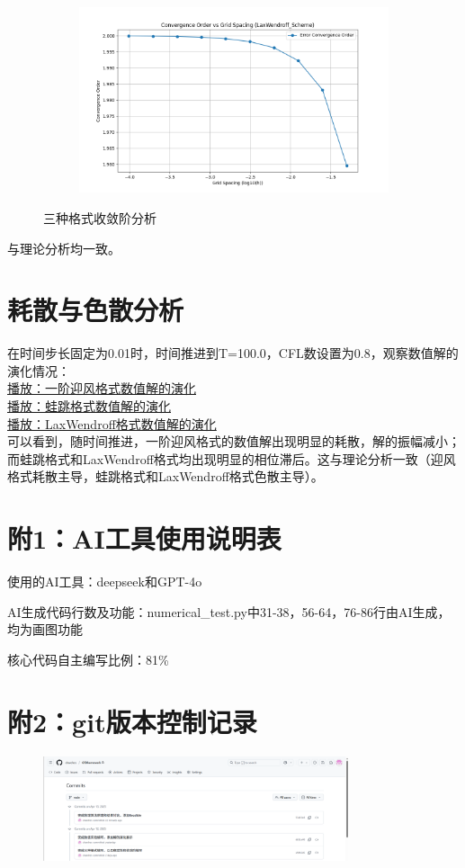 \documentclass[12pt, a4paper]{article}
\begin{document}
\begin{figure}[htbp]
\begin{subfigure}[b]{0.45\textwidth}
    \end{subfigure}
    \vspace{0.5cm}
    \centering
    \begin{subfigure}[b]{0.45\textwidth} 
        \centering
        \includegraphics[width=\textwidth]{./pictures/Convergence_Order_of_LaxWendroff_Scheme.png} 
    \end{subfigure}
    \caption{三种格式收敛阶分析}
\end{figure}
与理论分析均一致。

\section{耗散与色散分析}
在时间步长固定为0.01时，时间推进到T=100.0，CFL数设置为0.8，观察数值解的演化情况：\\
\href{run:./pictures/solution_evolution_of_Upwind_Scheme.mp4}{播放：一阶迎风格式数值解的演化}\\
\href{run:./pictures/solution_evolution_of_LeapFrog_Scheme.mp4}{播放：蛙跳格式数值解的演化}\\
\href{run:./pictures/solution_evolution_of_LaxWendroff_Scheme.mp4}{播放：LaxWendroff格式数值解的演化}\\

可以看到，随时间推进，一阶迎风格式的数值解出现明显的耗散，解的振幅减小；而蛙跳格式和LaxWendroff格式均出现明显的相位滞后。这与理论分析一致（迎风格式耗散主导，蛙跳格式和LaxWendroff格式色散主导）。

\section*{附1：AI工具使用说明表}
使用的AI工具：deepseek和GPT-4o

AI生成代码行数及功能：numerical\_test.py中31-38，56-64，76-86行由AI生成，均为画图功能

核心代码自主编写比例：81\%

\section*{附2：git版本控制记录}
\begin{figure}[htbp]
    \includegraphics[width=0.8\textwidth]{./pictures/git_control.png}
\end{figure}
\end{document}

